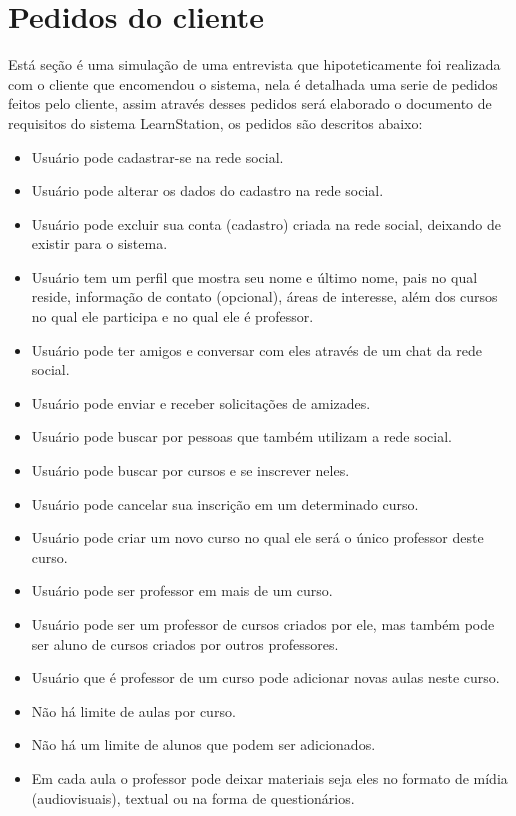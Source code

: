 \documentclass[12pt,a4paper,onecolumn,titlepage]{article}
\begin{document}
\section{Pedidos do cliente}
\label{sect:pedidos}

Está seção é uma simulação de uma entrevista que hipoteticamente foi realizada com o cliente que encomendou o sistema, nela é detalhada uma serie de pedidos feitos pelo cliente, assim através desses pedidos será elaborado o documento de requisitos do sistema LearnStation, os pedidos são descritos abaixo:

\begin{itemize}
\item Usuário pode cadastrar-se na rede social.
\item Usuário pode alterar os dados do cadastro na rede social.
\item Usuário pode excluir sua conta (cadastro) criada na rede social, deixando de existir para o sistema.
\item Usuário tem um perfil que mostra seu nome e último nome, pais no qual reside, informação de contato (opcional), áreas de interesse, além dos cursos no qual ele participa e no qual ele é professor.
\item Usuário pode ter amigos e conversar com eles através de um chat da rede social.
\item Usuário pode enviar e receber solicitações de amizades.
\item Usuário pode buscar por pessoas que também utilizam a rede social.
\item Usuário pode buscar por cursos e se inscrever neles.
\item Usuário pode cancelar sua inscrição em um determinado curso.
\item Usuário pode criar um novo curso no qual ele será o único professor deste curso.
\item Usuário pode ser professor em mais de um curso.
\item Usuário pode ser um professor de cursos criados por ele, mas também pode ser aluno de cursos criados por outros professores.
\item Usuário que é professor de um curso pode adicionar novas aulas neste curso.
\item Não há limite de aulas por curso.
\item Não há um limite de alunos que podem ser adicionados.
\item Em cada aula o professor pode deixar materiais seja eles no formato de mídia (audiovisuais), textual ou na forma de questionários.

\end{itemize}
\end{document}
